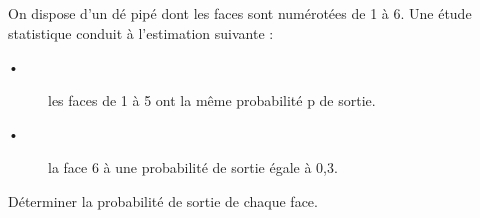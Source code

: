 
On dispose d'un dé pipé dont les faces sont numérotées de 1 à 6. Une étude statistique conduit à
l'estimation suivante :
\begin{description}
\item[•]  les faces de 1 à 5 ont la même probabilité p de sortie.
\item[•]  la face 6 à une probabilité de sortie égale à 0,3.
\end{description}
Déterminer la probabilité de sortie de chaque face.